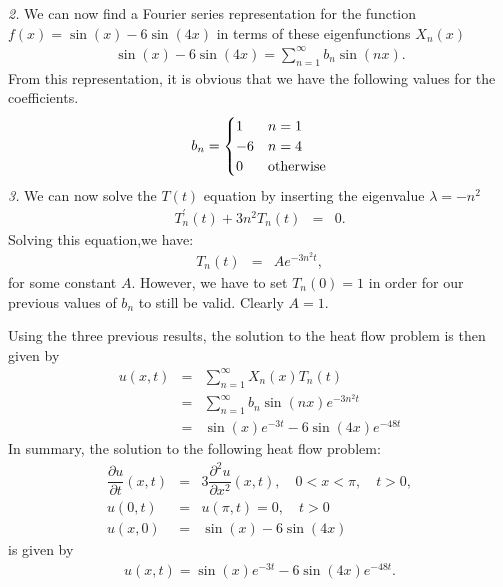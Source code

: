 \documentclass[11pt]{article}
\begin{document}
\begin{solution}
\textsl{2. } We can now find a Fourier series representation for the function $f(x)=\sin(x)-6 \sin(4x)$ in terms of these eigenfunctions $X_{n}(x)$
\begin{eqnarray*}
\sin(x)-6 \sin(4x) = \sum_{n=1}^{\infty} b_{n} \sin(nx).
\end{eqnarray*}
From this representation, it is obvious that we have the following values for the coefficients.
\begin{equation*}
b_{n} = \begin{cases}
1 & n=1 \\
-6  & n=4 \\
0  & {\rm otherwise} \\
\end{cases}
\end{equation*}
\textsl{3. } We can now solve the $T(t)$ equation by inserting the eigenvalue $ \lambda = -n^2$
\begin{eqnarray*}
T_{n}^{\prime}(t) + 3n^2 T_{n}(t) & = & 0.
\end{eqnarray*}
Solving this equation,we have:
\begin{eqnarray*}
T_{n}(t) & = & Ae^{-3n^2 t},
\end{eqnarray*}
for some constant $A$. However, we have to set $T_{n}(0)=1$ in order for our previous values of $b_{n}$ to still be valid. Clearly $A=1$.

Using the three previous results, the solution to the heat flow problem is then given by
\begin{eqnarray*}
u(x,t) & = & \sum_{n=1}^{\infty}X_{n}(x)T_{n}(t) \\
& = &\sum_{n=1}^{\infty}b_{n}\sin(nx)e^{-3n^2 t} \\
& = & \sin(x)e^{-3t} - 6\sin(4x)e^{-48 t}
\end{eqnarray*}
In summary, the solution to the following heat flow problem:
\begin{eqnarray*}
\dfrac{\partial u }{\partial t } (x,t)  & = & 3 \dfrac{\partial^2 u}{\partial x^2}(x,t), \quad 0<x<\pi, \quad t>0, \\
u(0,t) & = & u(\pi,t)=0, \quad t>0 \\
u(x,0) & = & \sin(x)-6 \sin(4x)
\end{eqnarray*}
is given by
\begin{eqnarray*}
\boxed{u(x,t) = \sin(x)e^{-3t} - 6\sin(4x)e^{-48 t}}.
\end{eqnarray*}
\end{solution}
\end{document}
